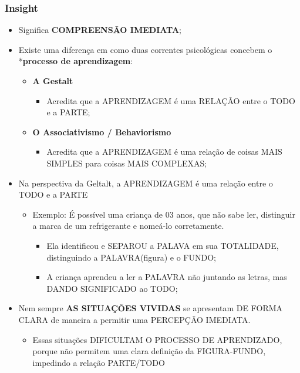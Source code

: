 \documentclass[
]{book}
\providecommand{\tightlist}{%
  \setlength{\itemsep}{0pt}\setlength{\parskip}{0pt}}
\begin{document}
\hypertarget{insight}{%
\subsubsection{Insight}\label{insight}}

\begin{itemize}
\tightlist
\item
  Significa \textbf{COMPREENSÃO IMEDIATA};
\item
  Existe uma diferença em como duas correntes psicológicas concebem o *\textbf{processo de aprendizagem}:

  \begin{itemize}
  \tightlist
  \item
    \textbf{A Gestalt}

    \begin{itemize}
    \tightlist
    \item
      Acredita que a APRENDIZAGEM é uma RELAÇÃO entre o TODO e a PARTE;
    \end{itemize}
  \item
    \textbf{O Associativismo / Behaviorismo}

    \begin{itemize}
    \tightlist
    \item
      Acredita que a APRENDIZAGEM é uma relação de coisas MAIS SIMPLES para coisas MAIS COMPLEXAS;
    \end{itemize}
  \end{itemize}
\item
  Na perspectiva da Geltalt, a APRENDIZAGEM é uma relação entre o TODO e a PARTE

  \begin{itemize}
  \tightlist
  \item
    Exemplo: É possível uma criança de 03 anos, que não sabe ler, distinguir a marca de um refrigerante e nomeá-lo corretamente.

    \begin{itemize}
    \tightlist
    \item
      Ela identificou e SEPAROU a PALAVA em sua TOTALIDADE, distinguindo a PALAVRA(figura) e o FUNDO;
    \item
      A criança aprendeu a ler a PALAVRA não juntando as letras, mas DANDO SIGNIFICADO ao TODO;
    \end{itemize}
  \end{itemize}
\item
  Nem sempre \textbf{AS SITUAÇÕES VIVIDAS} se apresentam DE FORMA CLARA de maneira a permitir uma PERCEPÇÃO IMEDIATA.

  \begin{itemize}
  \tightlist
  \item
    Essas situações DIFICULTAM O PROCESSO DE APRENDIZADO, porque não permitem uma clara definição da FIGURA-FUNDO, impedindo a relação PARTE/TODO
  \end{itemize}
\end{itemize}
\end{document}
